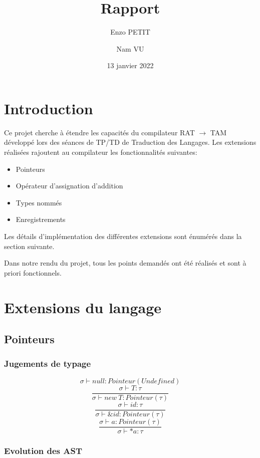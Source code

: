 \documentclass[headings=standardclasses,parskip=half]{scrartcl}
\title{Rapport}
\subtitle{}
\author{Enzo PETIT \and Nam VU}
\date{13 janvier 2022}
\begin{document}
\maketitle

\tableofcontents

\pagebreak

\section{Introduction}
Ce projet cherche à étendre les capacités du compilateur RAT \(\to\)
TAM développé lors des séances de TP/TD de Traduction des Langages.
Les extensions réalisées rajoutent au compilateur
les fonctionnalités suivantes:

\begin{itemize}
    \item Pointeurs
    \item Opérateur d'assignation d'addition
    \item Types nommés
    \item Enregistrements
\end{itemize}

Les détails d'implémentation des différentes extensions sont énumérés
dans la section suivante.

Dans notre rendu du projet, tous les points demandés ont été réalisés
et sont à priori fonctionnels.

\section{Extensions du langage}

\subsection{Pointeurs}

\subsubsection*{Jugements de typage}

\[\sigma \vdash null : Pointeur(Undefined)\]
\[\frac{\sigma \vdash T : \tau}{\sigma \vdash new\ T : Pointeur(\tau)}\]
\[\frac{\sigma \vdash id : \tau}{\sigma \vdash \&id : Pointeur(\tau)}\]
\[\frac{\sigma \vdash a : Pointeur(\tau)}{\sigma \vdash *a : \tau}\]

\subsubsection*{Evolution des AST}
\end{document}
